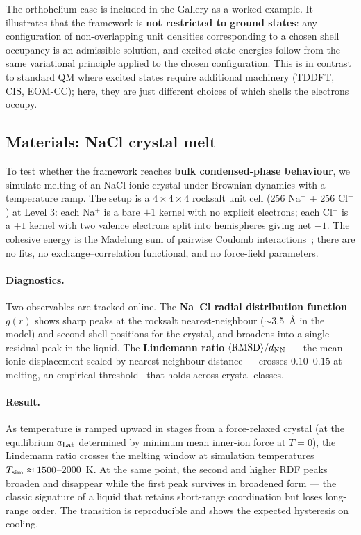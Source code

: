 \documentclass[11pt]{article}
\begin{document}
The orthohelium case is included in the Gallery as a worked example. It illustrates that the framework is \textbf{not restricted to ground states}: any configuration of non-overlapping unit densities corresponding to a chosen shell occupancy is an admissible solution, and excited-state energies follow from the same variational principle applied to the chosen configuration. This is in contrast to standard QM where excited states require additional machinery (TDDFT, CIS, EOM-CC); here, they are just different choices of which shells the electrons occupy.

\subsection{Materials: NaCl crystal melt}\label{sec:nacl}

To test whether the framework reaches \textbf{bulk condensed-phase behaviour}, we simulate melting of an NaCl ionic crystal under Brownian dynamics with a temperature ramp. The setup is a $4 \times 4 \times 4$ rocksalt unit cell (256 Na$^+$ + 256 Cl$^-$) at Level 3: each Na$^+$ is a bare $+1$ kernel with no explicit electrons; each Cl$^-$ is a $+1$ kernel with two valence electrons split into hemispheres giving net $-1$. The cohesive energy is the Madelung sum of pairwise Coulomb interactions~\cite{BornMayer32}; there are no fits, no exchange--correlation functional, and no force-field parameters.

\paragraph{Diagnostics.}
Two observables are tracked online. The \textbf{Na--Cl radial distribution function} $g(r)$ shows sharp peaks at the rocksalt nearest-neighbour ($\sim$3.5~\AA{} in the model) and second-shell positions for the crystal, and broadens into a single residual peak in the liquid. The \textbf{Lindemann ratio} $\langle\mathrm{RMSD}\rangle / d_{\rm NN}$ --- the mean ionic displacement scaled by nearest-neighbour distance --- crosses $0.10$--$0.15$ at melting, an empirical threshold~\cite{Lindemann10} that holds across crystal classes.

\paragraph{Result.}
As temperature is ramped upward in stages from a force-relaxed crystal (at the equilibrium $a_{\rm Lat}$ determined by minimum mean inner-ion force at $T = 0$), the Lindemann ratio crosses the melting window at simulation temperatures $T_{\rm sim} \approx 1500$--$2000$~K. At the same point, the second and higher RDF peaks broaden and disappear while the first peak survives in broadened form --- the classic signature of a liquid that retains short-range coordination but loses long-range order. The transition is reproducible and shows the expected hysteresis on cooling.
\end{document}
